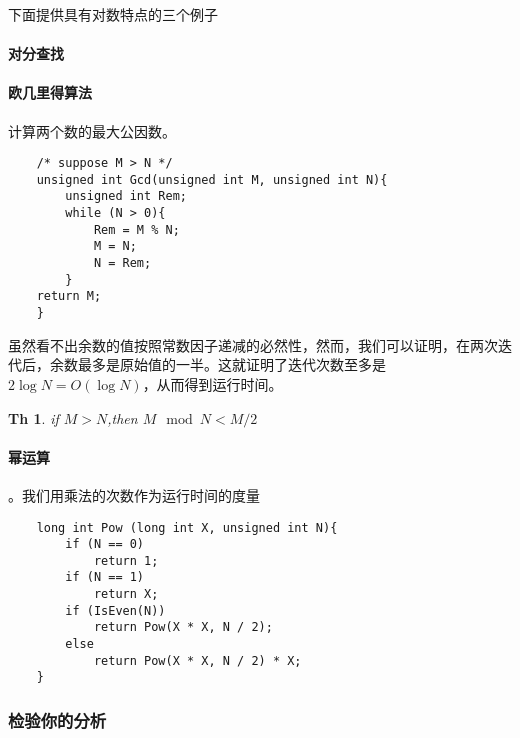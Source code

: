 \documentclass[utf8]{ctexbook}
\newtheorem{Theorem}{\large\textbf Th}[chapter]
\begin{document}
    \heiti 下面提供具有对数特点的三个例子
\paragraph{对分查找}
\paragraph{欧几里得算法} 计算两个数的最大公因数。

\begin{lstlisting}
    /* suppose M > N */
    unsigned int Gcd(unsigned int M, unsigned int N){ 
        unsigned int Rem;
        while (N > 0){
            Rem = M % N;
            M = N; 
            N = Rem;
        }
    return M;
    }
\end{lstlisting}

虽然看不出余数的值按照常数因子递减的必然性，然而，我们可以证明，在两次迭代后，余数最多是原始值的一半。这就证明了迭代次数至多是$2\log N = O(\log N)$，从而得到运行时间。

\begin{Theorem}
    if $M>N$,then $M\mod N < M/2$
\end{Theorem}

\paragraph{幂运算}。我们用乘法的次数作为运行时间的度量
\begin{lstlisting}
    long int Pow (long int X, unsigned int N){
        if (N == 0)
            return 1;
        if (N == 1)
            return X;
        if (IsEven(N))
            return Pow(X * X, N / 2);
        else 
            return Pow(X * X, N / 2) * X;
    }
\end{lstlisting}

\subsubsection{检验你的分析}
\end{document}
